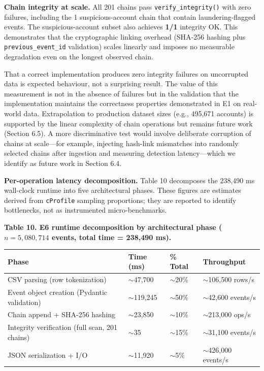 \textbf{Chain integrity at scale.} All 201 chains pass \texttt{verify\_integrity()} with zero failures, including the 1 suspicious-account chain that contain laundering-flagged events. The suspicious-account subset also achieves \textbf{1/1} integrity OK. This demonstrates that the cryptographic linking overhead (SHA-256 hashing plus \texttt{previous\_event\_id} validation) scales linearly and imposes no measurable degradation even on the longest observed chain.

That a correct implementation produces zero integrity failures on uncorrupted data is expected behaviour, not a surprising result. The value of this measurement is not in the absence of failures but in the validation that the implementation maintains the correctness properties demonstrated in E1 on real-world data. Extrapolation to production dataset sizes (e.g., 495,671 accounts) is supported by the linear complexity of chain operations but remains future work (Section 6.5). A more discriminative test would involve deliberate corruption of chains at scale---for example, injecting hash-link mismatches into randomly selected chains after ingestion and measuring detection latency---which we identify as future work in Section 6.4.

\textbf{Per-operation latency decomposition.} Table 10 decomposes the 238,490 ms wall-clock runtime into five architectural phases. These figures are estimates derived from \texttt{cProfile} sampling proportions; they are reported to identify bottlenecks, not as instrumented micro-benchmarks.

\textbf{Table 10. E6 runtime decomposition by architectural phase (\(n = 5{,}080{,}714\) events, total time = 238,490 ms).}

\begin{longtable}[]{@{}>{\raggedright\arraybackslash}p{}
  >{\centering\arraybackslash}p{}
  >{\centering\arraybackslash}p{}
  >{\raggedright\arraybackslash}p{}@{}}
\toprule
Phase
& Time (ms)
& \% Total
& Throughput
\\
\midrule
\endhead
\bottomrule
\endlastfoot
CSV parsing (row tokenization) & $\sim$47,700 & $\sim$20\% & $\sim$106,500 rows/s \\
Event object creation (Pydantic validation) & $\sim$119,245 & $\sim$50\% & $\sim$42,600 events/s \\
Chain append + SHA-256 hashing & $\sim$23,850 & $\sim$10\% & $\sim$213,000 ops/s \\
Integrity verification (full scan, 201 chains) & $\sim$35 & $\sim$15\% & $\sim$31,100 events/s \\
JSON serialization + I/O & $\sim$11,920 & $\sim$5\% & $\sim$426,000 events/s \\
\end{longtable}

